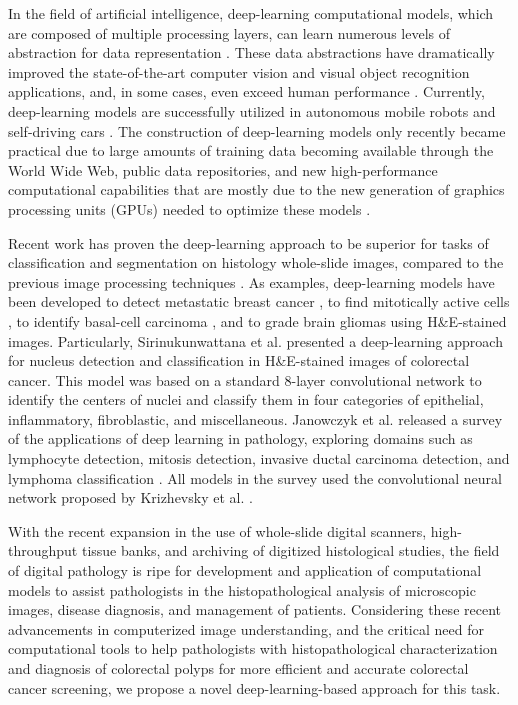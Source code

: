 \documentclass[review]{elsarticle}
\begin{document}
In the field of artificial intelligence, deep-learning computational models, which are composed of multiple processing layers, can learn numerous levels of abstraction for data representation \citep{lecun2015deep}. These data abstractions have dramatically improved the state-of-the-art computer vision and visual object recognition applications, and, in some cases, even exceed human performance \citep{he2015delving}. Currently, deep-learning models are successfully utilized in autonomous mobile robots and self-driving cars \citep{farabet2012scene,hadsell2009learning}. The construction of deep-learning models only recently became practical due to large amounts of training data becoming available through the World Wide Web, public data repositories, and new high-performance computational capabilities that are mostly due to the new generation of graphics processing units (GPUs) needed to optimize these models \citep{lecun2015deep}.

Recent work has proven the deep-learning approach to be superior for tasks of classification and segmentation on histology whole-slide images, compared to the previous image processing techniques \citep{xie2015deep,sirinukunwattana2016locality,janowczyk2016deep}. As examples, deep-learning models have been developed to detect metastatic breast cancer \citep{cruz2013deep}, to find mitotically active cells \citep{ertosun2015automated}, to identify basal-cell carcinoma \citep{malon2013classification}, and to grade brain gliomas \citep{wang2014cascaded} using H\&E-stained images. Particularly, Sirinukunwattana et al. \citep{sirinukunwattana2015stochastic} presented a deep-learning approach for nucleus detection and classification in H\&E-stained images of colorectal cancer. This model was based on a standard 8-layer convolutional network \citep{le1990handwritten} to identify the centers of nuclei and classify them in four categories of epithelial, inflammatory, fibroblastic, and miscellaneous. Janowczyk et al. released a survey of the applications of deep learning in pathology, exploring domains such as lymphocyte detection, mitosis detection, invasive ductal carcinoma detection, and lymphoma classification \citep{janowczyk2016deep}. All models in the survey used the convolutional neural network proposed by Krizhevsky et al. \citep{krizhevsky2012imagenet}.

With the recent expansion in the use of whole-slide digital scanners, high-throughput tissue banks, and archiving of digitized histological studies, the field of digital pathology is ripe for development and application of computational models to assist pathologists in the histopathological analysis of microscopic images, disease diagnosis, and management of patients. Considering these recent advancements in computerized image understanding, and the critical need for computational tools to help pathologists with histopathological characterization and diagnosis of colorectal polyps for more efficient and accurate colorectal cancer screening, we propose a novel deep-learning-based approach for this task.
\end{document}
